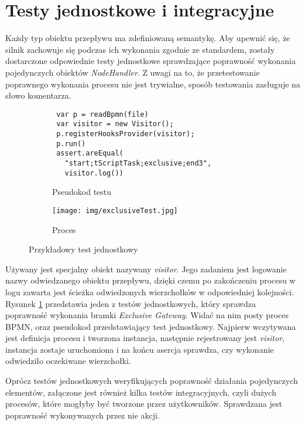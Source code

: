 \documentclass[declaration,shortabstract,mgr]{iithesis}
\newcommand{\bpmnnospace}{BPMN}
\begin{document}
\section{Testy jednostkowe i integracyjne}
Każdy typ obiektu przepływu ma zdefiniowaną semantykę. Aby upewnić się, że silnik zachowuje się podczas ich wykonania zgodnie ze standardem, zostały dostarczone odpowiednie testy jednostkowe sprawdzające poprawność wykonania pojedynczych obiektów \textit{NodeHandler}. Z uwagi na to, że przetestowanie poprawnego wykonania procesu nie jest trywialne, sposób testowania zasługuje na słowo komentarza.
\begin{figure}[H]
     \centering
     \begin{subfigure}[b]{0.59\textwidth}
\begin{minipage}[c]{\textwidth}
\centering
\begin{lstlisting}
 var p = readBpmn(file)
 var visitor = new Visitor();
 p.registerHooksProvider(visitor);
 p.run()
 assert.areEqual(
   "start;tScriptTask;exclusive;end3",
   visitor.log())
\end{lstlisting}
\end{minipage}
        \caption{Pseudokod testu}
     \end{subfigure}
     \hfill
     \begin{subfigure}[b]{0.39\textwidth}
         \centering
         \texttt{[image: img/exclusiveTest.jpg]}
        \caption{Proces}
     \end{subfigure}
        \caption{Przykładowy test jednostkowy}
        \label{fig:unit-test}
\end{figure}



Używany jest specjalny obiekt nazywany \textit{visitor}. Jego zadaniem jest logowanie nazwy odwiedzanego obiektu przepływu, dzięki czemu po zakończeniu procesu w logu zawarta jest ścieżka odwiedzonych wierzchołków w odpowiedniej kolejności. Rysunek \ref{fig:unit-test} przedstawia jeden z testów jednostkowych, który sprawdza poprawność wykonania bramki \textit{Exclusive Gateway}. Widać na nim posty proces \bpmnnospace, oraz pseudokod przedstawiający test jednostkowy. Najpierw wczytywana jest definicja procesu i tworzona instancja, następnie rejestrowany jest \textit{visitor}, instancja zostaje uruchomiona i na końcu asercja sprawdza, czy wykonanie odwiedziło oczekiwane wierzchołki.


Oprócz testów jednostkowych weryfikujących poprawność działania pojedynczych elementów, załączone jest również kilka testów integracyjnych, czyli dużych procesów, które mogłyby być tworzone przez użytkowników. Sprawdzana jest poprawność wykonywanych przez nie akcji.
\end{document}
